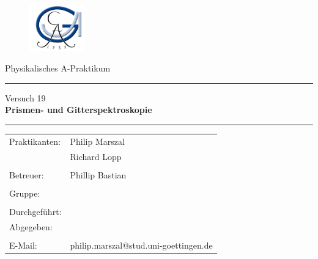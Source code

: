 \documentclass[a4paper, 12pt]{article}
\begin{document}
 \begin{titlepage}
 \begin{figure}[t]
 \includegraphics[height=2cm]{georg} \hfill
 \end{figure}

\normalsize
\vspace{1cm}

\begin{center}
\Large Physikalisches A-Praktikum \\ \vspace{1cm}
\hrule \vspace{3mm}
\large {Versuch 19} \\
\Huge{\bf Prismen- und Gitterspektroskopie}
\vspace{5mm}
\hrule
\end{center}

\normalsize

\begin{table}[!h]
\begin{center}

  \begin{tabular}{ll}
  Praktikanten: &Philip Marszal\\
   &Richard Lopp\\
   &\\
  Betreuer: & Phillip Bastian\\
  &\\
  Gruppe: &\\
  &\\
  Durchgeführt: &\\
  Abgegeben: &\\

\vspace{1cm}& \\
  E-Mail: & \ttfamily philip.marszal@stud.uni-goettingen.de\\
\end{tabular}
\end{center}
\end{table}
\vspace{2cm}
\flushright{}
\end{titlepage}
\end{document}
